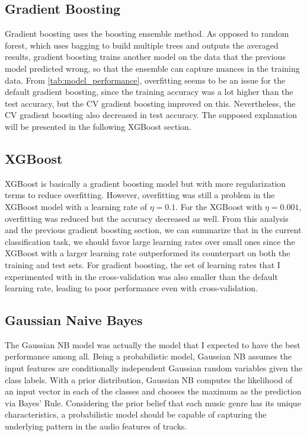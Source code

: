 \documentclass{article}
\begin{document}
\subsection{Gradient Boosting}

Gradient boosting uses the boosting ensemble method. As opposed to random forest, which uses bagging to build multiple trees and outputs the averaged results, gradient boosting trains another model on the data that the previous model predicted wrong, so that the ensemble can capture nuances in the training data. From \autoref{tab:model_performance}, overfitting seems to be an issue for the default gradient boosting, since the training accuracy was a lot higher than the test accuracy, but the CV gradient boosting improved on this. Nevertheless, the CV gradient boosting also decreased in test accuracy. The supposed explanation will be presented in the following XGBoost section.

\subsection{XGBoost}

XGBoost is basically a gradient boosting model but with more regularization terms to reduce overfitting. However, overfitting was still a problem in the XGBoost model with a learning rate of \(\eta=0.1\). For the XGBoost with \(\eta=0.001\), overfitting was reduced but the accuracy decreased as well. From this analysis and the previous gradient boosting section, we can summarize that in the current classification task, we should favor large learning rates over small ones since the XGBoost with a larger learning rate outperformed its counterpart on both the training and test sets. For gradient boosting, the set of learning rates that I experimented with in the cross-validation was also smaller than the default learning rate, leading to poor performance even with cross-validation.

\subsection{Gaussian Naive Bayes}

The Gaussian NB model was actually the model that I expected to have the best performance among all. Being a probabilistic model, Gaussian NB assumes the input features are conditionally independent Gaussian random variables given the class labels. With a prior distribution, Gaussian NB computes the likelihood of an input vector in each of the classes and chooses the maximum as the prediction via Bayes' Rule. Considering the prior belief that each music genre has its unique characteristics, a probabilistic model should be capable of capturing the underlying pattern in the audio features of tracks.
\end{document}
